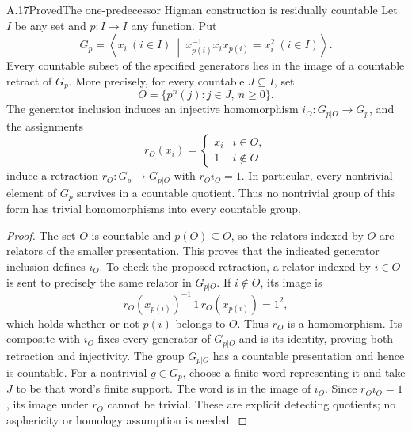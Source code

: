 \begin{claim}{A.17}{Proved}{The one-predecessor Higman construction is residually countable}
Let $I$ be any set and $p:I\to I$ any function. Put
\[
 G_p=\left\langle x_i\ (i\in I)\ \middle|\
 x_{p(i)}^{-1}x_i x_{p(i)}=x_i^2\ (i\in I)\right\rangle.
\]
Every countable subset of the specified generators lies in the
image of a countable retract of $G_p$. More precisely, for every
countable $J\subseteq I$, set
\[
 O=\{p^n(j):j\in J,\ n\geq0\}.
\]
The generator inclusion induces an injective homomorphism
$i_O:G_{p|O}\to G_p$, and the assignments
\[
 r_O(x_i)=
 \begin{cases}x_i&i\in O,\\1&i\notin O\end{cases}
\]
induce a retraction $r_O:G_p\to G_{p|O}$ with $r_Oi_O=1$.
In particular, every nontrivial element of $G_p$ survives in a
countable quotient. Thus no nontrivial group of this form has
trivial homomorphisms into every countable group.
\end{claim}
\begin{proof}
The set $O$ is countable and $p(O)\subseteq O$, so the relators
indexed by $O$ are relators of the smaller presentation. This
proves that the indicated generator inclusion defines $i_O$.
To check the proposed retraction, a relator indexed by $i\in O$
is sent to precisely the same relator in $G_{p|O}$. If $i\notin O$,
its image is
\[
 r_O(x_{p(i)})^{-1}\,1\,r_O(x_{p(i)})=1^2,
\]
which holds whether or not $p(i)$ belongs to $O$. Thus $r_O$ is
a homomorphism. Its composite with $i_O$ fixes every generator
of $G_{p|O}$ and is its identity, proving both retraction and
injectivity. The group $G_{p|O}$ has a countable presentation
and hence is countable.
For a nontrivial $g\in G_p$, choose a finite word representing
it and take $J$ to be that word's finite support. The word is
in the image of $i_O$. Since $r_Oi_O=1$, its image under $r_O$
cannot be trivial. These are explicit detecting quotients;
no asphericity or homology assumption is needed.
\end{proof}
